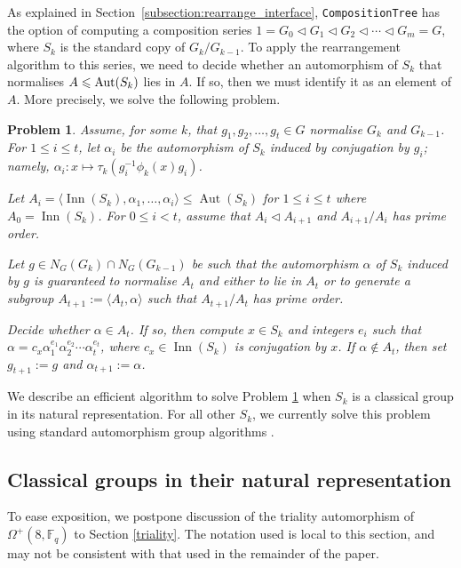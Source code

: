 \documentclass[12pt,twoside,reqno,psamsfonts]{amsproc}
\numberwithin{equation}{section}
\numberwithin{figure}{section}
\newcounter{algorithm}
\theoremstyle{plain}
\newtheorem{prob}[thm]{Problem}
\theoremstyle{definition}
\theoremstyle{remark}
\newcommand{\field}[1]{\mathbb{#1}}
\newcommand{\F}{\field{F}}
\newcommand{\Om}{\Omega}
\DeclareMathOperator{\Aut}{Aut}
\DeclareMathOperator{\Inn}{Inn}
\begin{document}
As explained in Section~\ref{subsection:rearrange_interface},
{\tt CompositionTree} has the option of computing a composition
series $1=G_0 \lhd G_1 \lhd G_2 \lhd \cdots \lhd G_m=G$, 
where $S_k$ is the standard copy of $G_k / G_{k - 1}$.
To apply the rearrangement algorithm to this series, 
we need to decide whether an automorphism of $S_k$ that 
normalises $A \leqslant {\rm Aut}(S_k)$
lies in $A$.  If so, then we must identify it as an element of $A$.
More precisely, we solve the following problem.
\begin{prob}\label{aut-problem}
Assume, for some $k$, that $g_1,g_2,\ldots,g_t \in G$ normalise $G_k$
and $G_{k-1}$.  For $1 \leqslant i \leqslant t$,
let $\alpha_i$ be the automorphism of $S_k$ induced by conjugation by
$g_i$; namely, $\alpha_i:x \mapsto \tau_k(g_i^{-1}\phi_k(x)g_i)$. 

Let $A_i = \langle \Inn(S_k), \alpha_1,\ldots,\alpha_i \rangle \leqslant \Aut(S_k)$
for $1 \leqslant i \leqslant t$ where $A_0 = \Inn(S_k)$. 
For $0 \leqslant i<t$, assume that
$A_i \lhd A_{i+1}$ and $A_{i+1}/A_i$ has prime order.

Let $g \in N_G(G_k) \cap N_G(G_{k-1})$ be such that the 
automorphism $\alpha$
of $S_k$ induced by $g$ is guaranteed to normalise $A_t$ and either to lie in
$A_t$ or to generate a subgroup $A_{t+1} := \langle A_t,\alpha \rangle$ such
that $A_{t+1}/A_t$ has prime order. 

Decide whether $\alpha \in A_t$.
If so, then compute $x \in S_k$ and integers $e_i$
such that $\alpha = c_x\alpha_1^{e_1}\alpha_2^{e_2}\cdots \alpha_t^{e_t}$,
where $c_x \in \Inn(S_k)$ is conjugation by $x$. If $\alpha \not\in A_t$,
then set $g_{t+1}:=g$ and $\alpha_{t+1}:=\alpha$. 
\end{prob}

We describe an efficient algorithm to solve Problem \ref{aut-problem}
when $S_k$ is a classical group in its natural representation.
For all other $S_k$, we currently solve this problem using standard
automorphism group algorithms \cite[Chapter 10]{hcgt}.

\subsection{Classical groups in their natural representation}
\label{natural}
To ease exposition, we postpone discussion of the 
triality automorphism of $\Om^+(8,\F_q)$ to Section \ref{triality}.
The notation used is local to this section, and may not
be consistent with that used in the remainder of the paper.
\end{document}
